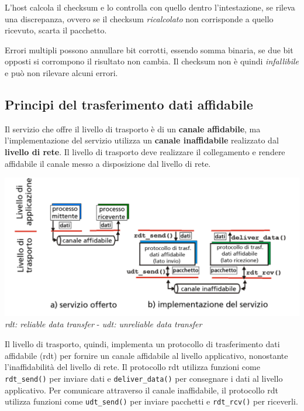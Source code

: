 L'host calcola il checksum e lo controlla con quello dentro l'intestazione, se rileva una discrepanza, ovvero se il checksum \textit{ricalcolato} non corrisponde a quello ricevuto, scarta il pacchetto.

Errori multipli possono annullare bit corrotti, essendo somma binaria, se due bit opposti si corrompono il risultato non cambia. Il checksum non è quindi \textit{infallibile} e può non rilevare alcuni errori.

\subsection{Principi del trasferimento dati affidabile}
Il servizio che offre il livello di trasporto è di un \textbf{canale affidabile}, ma l'implementazione del servizio utilizza un \textbf{canale inaffidabile} realizzato dal \textbf{livello di rete}. Il livello di trasporto deve realizzare il collegamento e rendere affidabile il canale messo a disposizione dal livello di rete.

\begin{center}
\includegraphics[width=\textwidth]{./img/implemntazionelivellotrasporto.png} 
\textit{rdt: reliable data transfer} - \textit{udt: unreliable data transfer}
\end{center}

Il livello di trasporto, quindi, implementa un protocollo di trasferimento dati affidabile (rdt) per fornire un canale affidabile al livello applicativo, nonostante l'inaffidabilità del livello di rete. Il protocollo rdt utilizza funzioni come \texttt{rdt\_send()} per inviare dati e \texttt{deliver\_data()} per consegnare i dati al livello applicativo. Per comunicare attraverso il canale inaffidabile, il protocollo rdt utilizza funzioni come \texttt{udt\_send()} per inviare pacchetti e \texttt{rdt\_rcv()} per riceverli.

